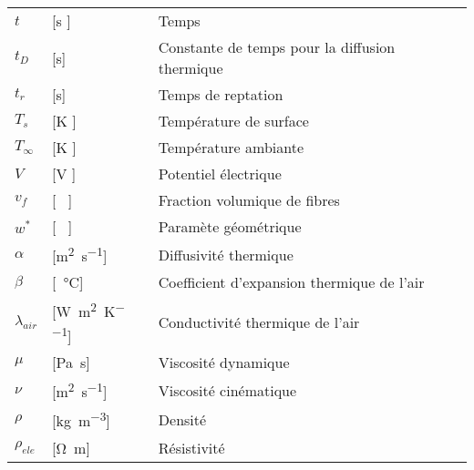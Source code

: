 \begin{longtable}{l p{2.5cm} p{4in}}
	$t$              & [\si{\second} ]                                     & Temps                                                        \\
	$t_D$            & [\si{\second}]                                      & Constante de temps pour la diffusion thermique               \\
	$t_r$            & [\si{\second}]                                      & Temps de reptation                                           \\
	$T_s$            & [\si{\kelvin} ]                                     & Température de surface                                       \\
	$T_{\infty}$     & [\si{\kelvin} ]                                     & Température ambiante                                         \\
	$V$              & [\si{\volt} ]                                       & Potentiel électrique                                         \\
	$v_f$            & [ \ ]                                               & Fraction volumique de fibres                                 \\
	$w^*$            & [ \ ]                                               & Paramète géométrique                                         \\
	$\alpha$         & [\si{\square\metre\per\second}]                     & Diffusivité thermique                                        \\
	$\beta$          & [\si{\per\celsius}]                                 & Coefficient d'expansion thermique de l'air                   \\
	$\lambda_{air}$  & [\si{\watt\per\square\metre\per\kelvin}]            & Conductivité thermique de l'air                              \\
	$\mu$            & [\si{\pascal\second}]                               & Viscosité dynamique                                          \\
	$\nu$            & [\si{\square\metre\per\second}]                     & Viscosité cinématique                                        \\
	$\rho$           & [\si{\kilogram\per\cubic\metre}]                    & Densité                                                      \\
	$\rho_{ele}$     & [\si{\ohm\metre}]                                   & Résistivité                                                  \\

\end{longtable}
